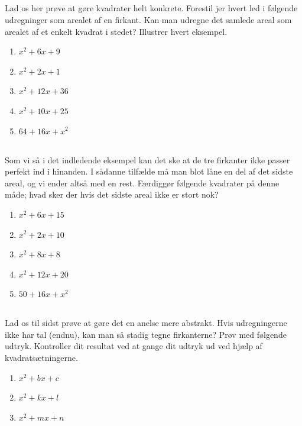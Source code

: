 \documentclass[10pt,a4paper,table]{article}
\begin{document}
\subsection{}
Lad os her prøve at gøre kvadrater helt konkrete. Forestil jer hvert led i følgende udregninger som arealet af en firkant. Kan man udregne det samlede areal som arealet af et enkelt kvadrat i stedet? Illustrer hvert eksempel.
\begin{enumerate}
  \item $x^2+6x+9$
  \item $x^2+2x+1$
  \item $x^2+12x+36$
  \item $x^2+10x+25$
  \item $64+16x+x^2$
\end{enumerate}

\subsection{}
Som vi så i det indledende eksempel kan det ske at de tre firkanter ikke passer perfekt ind i hinanden. I sådanne tilfælde må man blot låne en del af det sidste areal, og vi ender altså med en rest. Færdiggør følgende kvadrater på denne måde; hvad sker der hvis det sidste areal ikke er stort nok?  
\begin{enumerate}
  \item $x^2+6x+15$
  \item $x^2+2x+10$
  \item $x^2+8x+8$
  \item $x^2+12x+20$
  \item $50+16x+x^2$
\end{enumerate}

\subsection{}
Lad os til sidst prøve at gøre det en anelse mere abstrakt. Hvis udregningerne ikke har tal (endnu), kan man så stadig tegne firkanterne? Prøv med følgende udtryk. Kontroller dit resultat ved at gange dit udtryk ud ved hjælp af kvadratsætningerne.
\begin{enumerate}
  \item $x^2+bx+c$
  \item $x^2+kx+l$
  \item $x^2+mx+n$
\end{enumerate}
\end{document}
